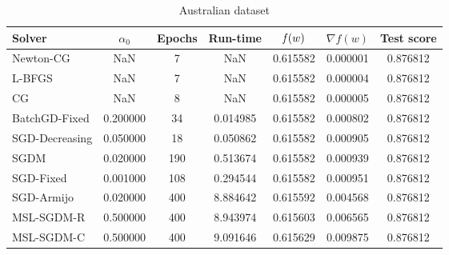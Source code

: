 \begin{table}
\caption{Australian dataset}
\label{tab:austr-tab}
\centering
\begin{tabular}{lS[round-precision=3]S[drop-zero-decimal]S[round-precision=4]S[round-precision=6]S[exponent-mode=scientific]S[round-precision=6]}
\toprule
Solver & {$\alpha_0$} & {Epochs} & {Run-time} & {$\operatorname*{\mathit{f}}(w)$} & {$\nabla f(w)$} & {Test score} \\
\midrule
Newton-CG & NaN & 7 & NaN & 0.615582 & 0.000001 & 0.876812 \\
L-BFGS & NaN & 7 & NaN & 0.615582 & 0.000004 & 0.876812 \\
CG & NaN & 8 & NaN & 0.615582 & 0.000005 & 0.876812 \\
BatchGD-Fixed & 0.200000 & 34 & 0.014985 & 0.615582 & 0.000802 & 0.876812 \\
SGD-Decreasing & 0.050000 & 18 & 0.050862 & 0.615582 & 0.000905 & 0.876812 \\
SGDM & 0.020000 & 190 & 0.513674 & 0.615582 & 0.000939 & 0.876812 \\
SGD-Fixed & 0.001000 & 108 & 0.294544 & 0.615582 & 0.000951 & 0.876812 \\
SGD-Armijo & 0.020000 & 400 & 8.884642 & 0.615592 & 0.004568 & 0.876812 \\
MSL-SGDM-R & 0.500000 & 400 & 8.943974 & 0.615603 & 0.006565 & 0.876812 \\
MSL-SGDM-C & 0.500000 & 400 & 9.091646 & 0.615629 & 0.009875 & 0.876812 \\
\bottomrule
\end{tabular}
\end{table}

